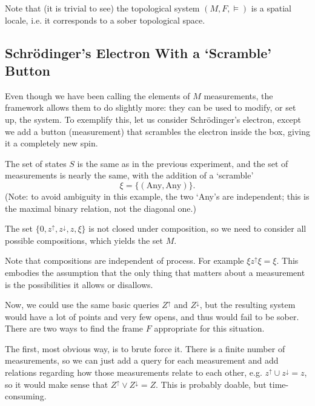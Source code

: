 \documentclass{article}
\theoremstyle{definition}
\theoremstyle{plain}
\begin{document}
Note that (it is trivial to see) the topological system $(M,F,\vDash)$ is a spatial locale, i.e. it corresponds to a sober topological space.

\subsection{Schrödinger's Electron With a `Scramble' Button}

Even though we have been calling the elements of $M$ measurements, the framework allows them to do slightly more: they can be used to modify, or set up, the system. To exemplify this, let us consider Schrödinger's electron, except we add a button (measurement) that scrambles the electron inside the box, giving it a completely new spin.

The set of states $S$ is the same as in the previous experiment, and the set of measurements is nearly the same, with the addition of a `scramble'
\begin{equation}
\xi = \{(\text{Any}, \text{Any})\}.
\end{equation}
(Note: to avoid ambiguity in this example, the two `Any's are independent; this is the maximal binary relation, not the diagonal one.)

The set $\{0,z^\uparrow, z^\downarrow, z, \xi\}$ is not closed under composition, so we need to consider all possible compositions, which yields the set $M$.

Note that compositions are independent of process. For example $\xi z^\uparrow \xi = \xi$. This embodies the assumption that the only thing that matters about a measurement is the possibilities it allows or disallows.

Now, we could use the same basic queries $Z^\uparrow$ and $Z^\downarrow$, but the resulting system would have a lot of points and very few opens, and thus would fail to be sober. There are two ways to find the frame $F$ appropriate for this situation.

The first, most obvious way, is to brute force it. There is a finite number of measurements, so we can just add a query for each measurement and add relations regarding how those measurements relate to each other, e.g. $z^\uparrow \cup z^\downarrow = z$, so it would make sense that $Z^\uparrow \lor Z^\downarrow = Z$. This is probably doable, but time-consuming.
\end{document}

